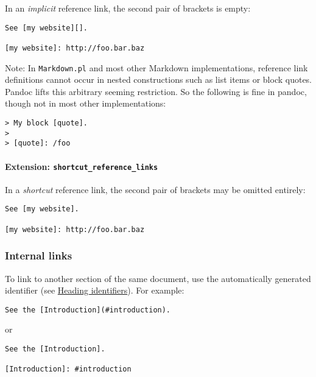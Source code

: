 \documentclass[]{article}
\begin{document}
In an \emph{implicit} reference link, the second pair of brackets is
empty:

\begin{verbatim}
See [my website][].

[my website]: http://foo.bar.baz
\end{verbatim}

Note: In \texttt{Markdown.pl} and most other Markdown implementations,
reference link definitions cannot occur in nested constructions such as
list items or block quotes. Pandoc lifts this arbitrary seeming
restriction. So the following is fine in pandoc, though not in most
other implementations:

\begin{verbatim}
> My block [quote].
>
> [quote]: /foo
\end{verbatim}

\hypertarget{extension-shortcut_reference_links}{%
\paragraph{\texorpdfstring{Extension:
\texttt{shortcut\_reference\_links}}{Extension: shortcut\_reference\_links}}\label{extension-shortcut_reference_links}}

In a \emph{shortcut} reference link, the second pair of brackets may be
omitted entirely:

\begin{verbatim}
See [my website].

[my website]: http://foo.bar.baz
\end{verbatim}

\hypertarget{internal-links}{%
\subsubsection{Internal links}\label{internal-links}}

To link to another section of the same document, use the automatically
generated identifier (see
\protect\hyperlink{heading-identifiers}{Heading identifiers}). For
example:

\begin{verbatim}
See the [Introduction](#introduction).
\end{verbatim}

or

\begin{verbatim}
See the [Introduction].

[Introduction]: #introduction
\end{verbatim}
\end{document}
